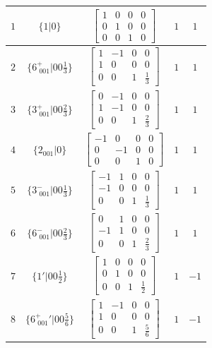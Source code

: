 \documentclass[fleqn,8pt]{jsarticle}
\begin{document}
\begin{longtable}{ccccc}
$ 1 $ & $ \{1|0\} $ & $ \begin{bmatrix} 1 & 0 & 0 & 0 \\ 0 & 1 & 0 & 0 \\ 0 & 0 & 1 & 0 \end{bmatrix} $ & $ 1 $ & $ 1 $ \\ \hline
$ 2 $ & $ \{6^{+}_{\,\,001}|0 0 \frac{1}{3}\} $ & $ \begin{bmatrix} 1 & -1 & 0 & 0 \\ 1 & 0 & 0 & 0 \\ 0 & 0 & 1 & \frac{1}{3} \end{bmatrix} $ & $ 1 $ & $ 1 $ \\ \hline
$ 3 $ & $ \{3^{+}_{\,\,001}|0 0 \frac{2}{3}\} $ & $ \begin{bmatrix} 0 & -1 & 0 & 0 \\ 1 & -1 & 0 & 0 \\ 0 & 0 & 1 & \frac{2}{3} \end{bmatrix} $ & $ 1 $ & $ 1 $ \\ \hline
$ 4 $ & $ \{2{}_{001}|0\} $ & $ \begin{bmatrix} -1 & 0 & 0 & 0 \\ 0 & -1 & 0 & 0 \\ 0 & 0 & 1 & 0 \end{bmatrix} $ & $ 1 $ & $ 1 $ \\ \hline
$ 5 $ & $ \{3^{-}_{\,\,001}|0 0 \frac{1}{3}\} $ & $ \begin{bmatrix} -1 & 1 & 0 & 0 \\ -1 & 0 & 0 & 0 \\ 0 & 0 & 1 & \frac{1}{3} \end{bmatrix} $ & $ 1 $ & $ 1 $ \\ \hline
$ 6 $ & $ \{6^{-}_{\,\,001}|0 0 \frac{2}{3}\} $ & $ \begin{bmatrix} 0 & 1 & 0 & 0 \\ -1 & 1 & 0 & 0 \\ 0 & 0 & 1 & \frac{2}{3} \end{bmatrix} $ & $ 1 $ & $ 1 $ \\ \hline
$ 7 $ & $ \{1{}'|0 0 \frac{1}{2}\} $ & $ \begin{bmatrix} 1 & 0 & 0 & 0 \\ 0 & 1 & 0 & 0 \\ 0 & 0 & 1 & \frac{1}{2} \end{bmatrix} $ & $ 1 $ & $ -1 $ \\ \hline
$ 8 $ & $ \{6^{+}_{\,\,001}{}'|0 0 \frac{5}{6}\} $ & $ \begin{bmatrix} 1 & -1 & 0 & 0 \\ 1 & 0 & 0 & 0 \\ 0 & 0 & 1 & \frac{5}{6} \end{bmatrix} $ & $ 1 $ & $ -1 $ \\ \hline

\end{longtable}
\end{document}
